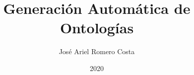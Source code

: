 \documentclass[12pt,twoside]{thesis}
\title{Generación Automática de Ontologías}
\author{José Ariel Romero Costa}
\date{2020}
\begin{document}
	\let\cleardoublepage\clearpage

	\frontmatter
	\maketitle

	
	
	

	

	

	

	

	

	\mainmatter

	

	

	

	

	

	\backmatter

	

	

	
\end{document}
